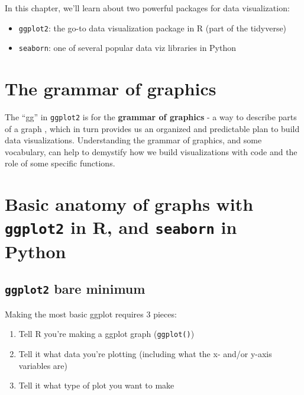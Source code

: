 \documentclass[
]{book}
\providecommand{\tightlist}{%
  \setlength{\itemsep}{0pt}\setlength{\parskip}{0pt}}
\begin{document}
In this chapter, we'll learn about two powerful packages for data visualization:

\begin{itemize}
\tightlist
\item
  \texttt{ggplot2}: the go-to data visualization package in R (part of the tidyverse)
\item
  \texttt{seaborn}: one of several popular data viz libraries in Python
\end{itemize}

\hypertarget{the-grammar-of-graphics}{%
\section{The grammar of graphics}\label{the-grammar-of-graphics}}

The ``gg'' in \texttt{ggplot2} is for the \textbf{grammar of graphics} - a way to describe parts of a graph \citep{layered-grammar}, which in turn provides us an organized and predictable plan to build data visualizations. Understanding the grammar of graphics, and some vocabulary, can help to demystify how we build visualizations with code and the role of some specific functions.

\hypertarget{basic-anatomy-of-graphs-with-ggplot2-in-r-and-seaborn-in-python}{%
\section{\texorpdfstring{Basic anatomy of graphs with \texttt{ggplot2} in R, and \texttt{seaborn} in Python}{Basic anatomy of graphs with ggplot2 in R, and seaborn in Python}}\label{basic-anatomy-of-graphs-with-ggplot2-in-r-and-seaborn-in-python}}

\hypertarget{ggplot2-bare-minimum}{%
\subsection{\texorpdfstring{\texttt{ggplot2} bare minimum}{ggplot2 bare minimum}}\label{ggplot2-bare-minimum}}

Making the most basic ggplot requires 3 pieces:

\begin{enumerate}
\def\labelenumi{\arabic{enumi}.}
\tightlist
\item
  Tell R you're making a ggplot graph (\texttt{ggplot()})
\item
  Tell it what data you're plotting (including what the x- and/or y-axis variables are)
\item
  Tell it what type of plot you want to make
\end{enumerate}
\end{document}
